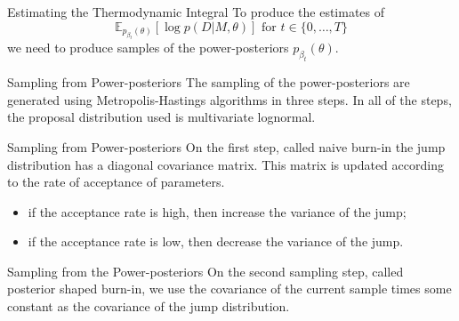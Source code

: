 \documentclass{beamer}
\newcommand{\expectation}{\mathbb{E}}
\begin{document}
\begin{frame}{Estimating the Thermodynamic Integral}
To produce the estimates of 
\begin{equation*}
    \expectation_{p_{\beta_{t}} (\theta)}[\log p(D | M, \theta)]
    \text{ for }
    t \in \{0, \ldots, T\}
\end{equation*}    
we need to produce samples of the 
power-posteriors $p_{\beta_{t}} (\theta)$.
\end{frame}

%
%
%
%
\begin{frame}{Sampling from Power-posteriors}
The sampling of the power-posteriors are generated using 
Metropolis-Hastings algorithms in three steps. \pause In all of the 
steps, the proposal distribution used is multivariate lognormal.
\end{frame}


\begin{frame}{Sampling from Power-posteriors}
On the first step, called \alert{naive burn-in} the jump distribution 
has a diagonal covariance matrix. \pause This matrix is updated 
according to the rate of acceptance of parameters.

\pause
\begin{itemize}
\item{if the acceptance rate is high, then increase the variance of the
    jump;}

\pause
\item{if the acceptance rate is low, then decrease the variance of the 
    jump.}
\end{itemize}

\pause
\end{frame}

\begin{frame}{Sampling from the Power-posteriors}
On the second sampling step, called \alert{posterior shaped burn-in}, we
use the covariance of the current sample times some constant as the 
covariance of the jump distribution.
\end{frame}
\end{document}
